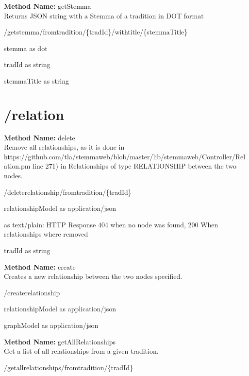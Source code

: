 \textbf{Method Name: }getStemma \\ Returns JSON string with a Stemma of a tradition in DOT format
\begin{get}
/getstemma/fromtradition/\{tradId\}/withtitle/\{stemmaTitle\}
\end{get}
\begin{response}
stemma as dot
\end{response}
\begin{parameter}
tradId as string
\end{parameter}
\begin{parameter}
stemmaTitle as string
\end{parameter}
\section{/relation}
\textbf{Method Name: }delete \\ Remove all relationships, as it is done in https://github.com/tla/stemmaweb/blob/master/lib/stemmaweb/Controller/Relation.pm line 271) in Relationships of type RELATIONSHIP between the two nodes.
\begin{post}
/deleterelationship/fromtradition/\{tradId\}
\end{post}
\begin{request}
relationshipModel as application/json
\end{request}
\begin{response}
 as text/plain: HTTP Response 404 when no node was found, 200 When relationships where removed
\end{response}
\begin{parameter}
tradId as string
\end{parameter}
\textbf{Method Name: }create \\ Creates a new relationship between the two nodes specified.
\begin{post}
/createrelationship
\end{post}
\begin{request}
relationshipModel as application/json
\end{request}
\begin{response}
graphModel as application/json
\end{response}
\textbf{Method Name: }getAllRelationships \\ Get a list of all relationships from a given tradition.
\begin{get}
/getallrelationships/fromtradition/\{tradId\}
\end{get}
